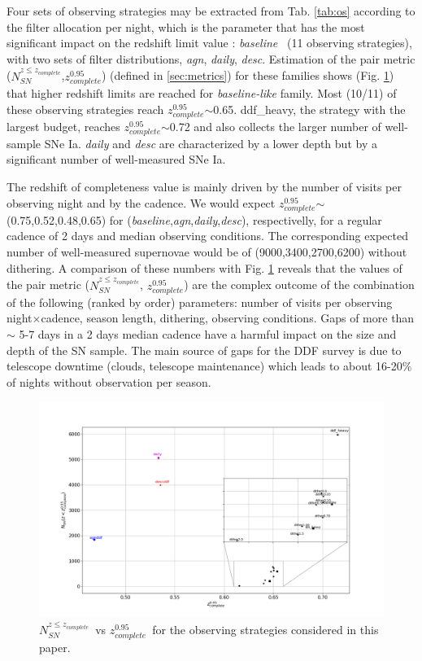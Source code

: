 \documentclass[\docopts]{\docclass}
\newcommand{\sne}{{SNe Ia}}
\newcommand{\nsncomp}{{$N_{SN}^{z\leq z_{complete}}$}}
\newcommand{\zcompb}{\mbox{$z_{complete}^{0.95}$}}
\newcommand{\osfamily}[1]{{\it #1}}
\begin{document}

%
%
%
Four sets of observing strategies may be extracted from Tab. \ref{tab:os} according to the filter allocation per night, which is the parameter that has the most significant impact on the redshift limit value : \osfamily{baseline}~ (11 observing strategies), with two sets of filter distributions, \osfamily{agn}, \osfamily{daily}, \osfamily{desc}. Estimation of the pair metric (\nsncomp,\zcompb) (defined in \ref{sec:metrics}) for these families shows (Fig. \ref{fig:nsn_zlim_zoom}) that higher redshift limits are reached for \osfamily{baseline-like} family. Most (10/11) of these observing strategies reach \zcompb$\sim$0.65. ddf\_heavy, the strategy with the largest budget, reaches \zcompb$\sim$0.72 and also collects the larger number of well-sample \sne. \osfamily{daily} and \osfamily{desc} are characterized by a lower depth but by a significant number of well-measured \sne.\par
The redshift of completeness value is mainly driven by the number of visits per observing night and by the cadence. We would expect \zcompb$\sim$(0.75,0.52,0.48,0.65) for (\osfamily{baseline},\osfamily{agn},\osfamily{daily},\osfamily{desc}), respectivelly, for a regular cadence of 2 days and median observing conditions. The corresponding expected number of well-measured supernovae would be of (9000,3400,2700,6200) without dithering. A comparison of these numbers with Fig. \ref{fig:nsn_zlim_zoom} reveals that the values of the pair metric (\nsncomp, \zcompb) are the complex outcome of the combination of the following (ranked by order) parameters: number of visits per observing night$\times$cadence, season length, dithering, observing conditions. Gaps of more than $\sim$ 5-7 days in a 2 days median cadence have a harmful
impact on the size and depth of the SN sample. The main source of gaps for the DDF survey is due to telescope downtime (clouds, telescope maintenance) which leads to about 16-20$\%$ of nights without observation per season.  

\begin{figure}[htbp]
\begin{center}
  \includegraphics[width=1.\textwidth]{nsn_zlim_zoom.png}
 \caption{\nsncomp~vs \zcompb~for the observing strategies considered in this paper.}\label{fig:nsn_zlim_zoom}
\end{center}
\end{figure}
\end{document}
